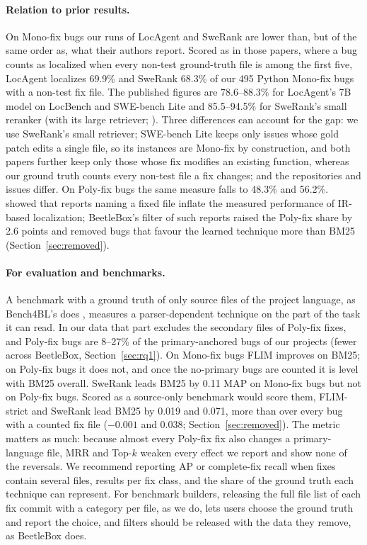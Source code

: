 \documentclass[a4paper,fleqn]{cas-dc}
\begin{document}
\paragraph{Relation to prior results.} On Mono-fix bugs our runs of LocAgent
and SweRank are lower than, but of the same order as, what their authors
report. Scored as in those
papers, where a bug counts as localized when every non-test ground-truth file
is among the first five, LocAgent localizes 69.9\% and SweRank 68.3\% of our
495 Python Mono-fix bugs with a non-test fix file. The published figures are
78.6--88.3\% for LocAgent's 7B model on LocBench and SWE-bench Lite
\citep{chen2025locagent} and 85.5--94.5\% for SweRank's small reranker (with
its large retriever; \citealp{reddy2025swerank}). Three differences can
account for the gap: we use SweRank's small retriever; SWE-bench Lite keeps
only issues whose gold patch edits a single file, so its instances are
Mono-fix by construction, and both papers further keep only those whose fix
modifies an existing function, whereas our ground truth counts every non-test
file a fix changes; and the repositories and issues differ. On Poly-fix bugs the same measure falls to
48.3\% and 56.2\%. \citet{kochhar2014potential} showed that reports naming a
fixed file inflate the measured performance of IR-based localization;
BeetleBox's filter of such reports raised the Poly-fix share by 2.6 points
and removed bugs that favour the learned technique more than BM25
(Section~\ref{sec:removed}).

\paragraph{For evaluation and benchmarks.} A benchmark with a ground truth of
only source files of the project language, as Bench4BL's does
\citep{lee2018bench4bl}, measures a parser-dependent technique on the part of
the task it can read. In our data
that part excludes the secondary files of Poly-fix fixes, and Poly-fix bugs
are 8--27\% of the primary-anchored bugs of our projects (fewer across
BeetleBox, Section~\ref{sec:rq1}). On Mono-fix bugs FLIM
improves on BM25; on Poly-fix bugs it does not, and once the no-primary bugs
are counted it is level with BM25 overall. SweRank leads BM25 by 0.11 MAP on
Mono-fix bugs but not on Poly-fix bugs. Scored as a source-only benchmark
would score them, FLIM-strict and SweRank lead BM25 by 0.019 and 0.071, more
than over every bug with a counted fix file ($-0.001$ and 0.038;
Section~\ref{sec:removed}). The metric matters as much: because
almost every Poly-fix fix also changes a primary-language file, MRR and Top-$k$
weaken every effect we report and show none of the reversals. We recommend
reporting AP or complete-fix recall when fixes contain several files, results
per fix class, and the share of the ground truth each technique can represent.
For benchmark builders, releasing the full file list of each fix commit with a
category per file, as we do, lets users choose the ground truth and report the
choice, and filters should be released with the data they remove, as
BeetleBox does.
\end{document}
